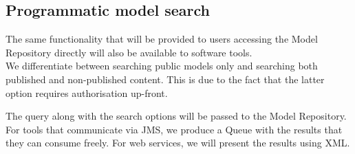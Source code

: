 \subsection{Programmatic model search}
The same functionality that will be provided to users accessing the \ddmore Model Repository directly will also be available to software tools. \\
We differentiate between searching public models only and searching both published and non-published content. This is due to the fact that the latter option requires authorisation up-front. 

\begin{techNote}
The query along with the search options will be passed to the Model Repository. For tools that communicate via JMS, we produce a Queue with the results that they can consume freely. For web services, we will present the results using XML. 
\end{techNote}

